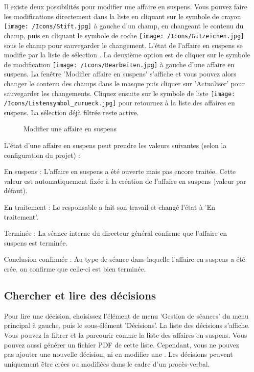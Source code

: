 Il existe deux possibilités pour modifier une affaire en suspens. Vous pouvez faire les modifications directement dans la liste en cliquant sur le symbole de crayon \texttt{[image: /Icons/Stift.jpg]}  à gauche d'un champ, en changeant le contenu du champ, puis en cliquant le symbole de coche \texttt{[image: /Icons/Gutzeichen.jpg]}  sous le champ pour sauvegarder le changement. L'état de l'affaire en suspens se modifie par la liste de sélection . La deuxième option est de cliquer sur le symbole de modification \texttt{[image: /Icons/Bearbeiten.jpg]}  à gauche d'une affaire en suspens. La fenêtre 'Modifier affaire en suspens'  s'affiche et vous pouvez alors changer le contenu des champs dans le masque puis cliquer sur 'Actualiser' pour sauvegarder les changements. Cliquez ensuite sur le symbole de liste \texttt{[image: /Icons/Listensymbol\_zurueck.jpg]}  pour retournez à la liste des affaires en suspens. La sélection déjà filtrée reste active.

\begin{figure}[H]
\caption{Modifier une affaire en suspens}
\end{figure}

L'état d'une affaire en suspens peut prendre les valeurs suivantes (selon la configuration du projet) :

\begin{compactitem}
\item
En suspens : L'affaire en suspens a été ouverte mais pas encore traitée. Cette valeur est automatiquement fixée à la création de l'affaire en suspens (valeur par défaut).
\item
En traitement : Le responsable a fait son travail et changé l'état à 'En traitement'.
\item
Terminée : La séance interne du directeur général confirme que l'affaire en suspens est terminée.
\item
Conclusion confirmée : Au type de séance dans laquelle l'affaire en suspens a été crée, on confirme que celle-ci est bien terminée.
\end{compactitem}

\subsection{Chercher et lire des décisions}

Pour lire une décision, choisissez l'élément de menu 'Gestion de séances' du menu principal à gauche, puis le sous-élément 'Décisions'. La liste des décisions s'affiche. Vous pouvez la filtrer et la parcourir comme la liste des affaires en suspens. Vous pouvez aussi générer un fichier PDF de cette liste. Cependant, vous ne pouvez pas ajouter une nouvelle décision, ni en modifier une . Les décisions peuvent uniquement être crées ou modifiées dans le cadre d'un procès-verbal.

